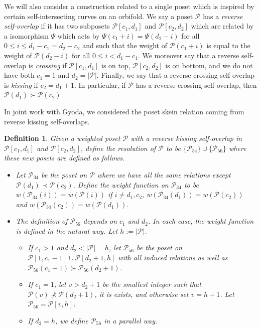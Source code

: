 \documentclass[12pt, letterpaper,table]{amsart}
\newtheorem{definition}[theorem]{Definition}
\theoremstyle{remark}
\newcommand{\calP}{\mathcal{P}}
\begin{document}
We will also consider a construction related to a single poset which is inspired by certain self-intersecting curves on an orbifold.  
 We say a poset $\calP$ has a \emph{reverse self-overlap} if it has two subposets $\calP[c_1,d_1]$ and $\calP[c_2,d_2]$ which are related by a isomorphism $\Psi$ which acts by $\Psi(c_1 + i) = \Psi(d_2-i)$ for all $0 \leq i \leq d_1 - c_1 = d_2 - c_2$ and such that the weight of $\calP(c_1+i)$ is equal to the weight of $\calP(d_2-i)$ for all $0 \leq i < d_1-c_1$. We moreover say that a reverse self-overlap is \emph{crossing} if $\calP[c_1,d_1]$ is on top, $\calP[c_2,d_2]$ is on bottom, and we do not have both $c_1 = 1$ and $d_2 = \vert \calP \vert$.  Finally, we say that a reverse crossing self-overlap is \emph{kissing} if $c_2 = d_1 + 1$. In particular, if $\calP$ has a  reverse crossing self-overlap, then $\calP(d_1) \succ \calP(c_2)$.
 
In joint work with Gyoda, we considered the poset skein relation coming from reverse kissing self-overlaps. 

\begin{definition}\label{def:ResolveRKSO}\cite[Definition 8.9]{BG} 
Given a weighted poset $\calP$ with a reverse kissing self-overlap in $\calP[c_1,d_1]$ and $\calP[c_2,d_2]$, define the \emph{resolution} of $\calP$ to be $\{\calP_{34}\} \cup \{\calP_{56}\}$ where these new posets are defined as follows. 
\begin{itemize}
    \item Let $\calP_{34}$ be the poset on $\calP$ where we have all the same relations except $\calP(d_1) \prec \calP(c_2)$. Define the weight function on $\calP_{34}$ to be $w(\calP_{34}(i)) = w(\calP(i))$ if $i \neq d_1,c_2$, $w(\calP_{34}(d_1)) = w(\calP(c_2))$ and $w(\calP_{34}(c_2)) = w(\calP(d_1))$.
    \item The definition of $\calP_{56}$ depends on $c_1$ and $d_2$. In each case, the weight function is defined in the natural way. Let $h:= \vert \calP \vert$.
    \begin{itemize}
        \item If $c_1>1$ and $d_2 < \vert \calP \vert = h$, let $\calP_{56}$ be the poset on $\calP[1,c_1-1] \cup \calP[d_2+1,h]$ with all induced relations as well as $\calP_{56}(c_1-1) \succ \calP_{56}(d_2+1)$.
        \item If $c_1 = 1$, let $v > d_2+1$ be the smallest integer such that $\calP(v) \not\prec \calP(d_2+1)$, it is exists, and otherwise set $v = h+1$. Let $\calP_{56} = \calP[v,h]$.
        \item If $d_2 = h$, we define $\calP_{56}$ in a parallel way. 
    \end{itemize} 
\end{itemize}
\end{definition}
\end{document}
